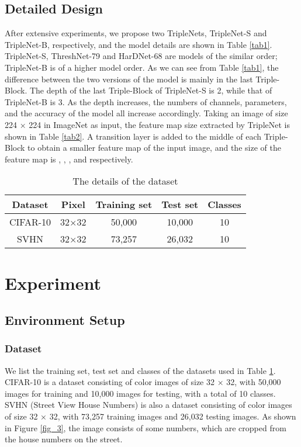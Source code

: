 \documentclass[default,iicol]{sn-jnl}
\theoremstyle{thmstyleone}\newtheorem{theorem}{Theorem}\newtheorem{proposition}[theorem]{Proposition}
\theoremstyle{thmstyletwo}\newtheorem{example}{Example}\newtheorem{remark}{Remark}
\theoremstyle{thmstylethree}\newtheorem{definition}{Definition}
\begin{document}
\subsection{Detailed Design}
After extensive experiments, we propose two TripleNets, TripleNet-S and TripleNet-B, respectively, and the model details are shown in Table \ref{tab1}. TripleNet-S, ThreshNet-79 and HarDNet-68 are models of the similar order; TripleNet-B is of a higher model order. As we can see from Table \ref{tab1}, the difference between the two versions of the model is mainly in the last Triple-Block. The depth of the last Triple-Block of TripleNet-S is 2, while that of TripleNet-B is 3. As the depth increases, the numbers of channels, parameters, and the accuracy of the model all increase accordingly. Taking an image of size 224 × 224 in ImageNet as input, the feature map size extracted by TripleNet is shown in Table \ref{tab2}. A transition layer is added to the middle of each Triple-Block to obtain a smaller feature map of the input image, and the size of the feature map is , , ,  and  respectively.

\begin{table}[]
\centering
\caption{The details of the dataset}
\label{tab3}
\begin{tabular}{|c|c|c|c|c|}
\hline
Dataset & Pixel & Training set & Test set & Classes \\ \hline
CIFAR-10 & 32×32 & 50,000 & 10,000 & 10 \\ \hline
SVHN & 32×32 & 73,257 & 26,032 & 10 \\ \hline
\end{tabular}
\end{table}

\section{Experiment}
\subsection{Environment Setup}
\subsubsection{Dataset}
We list the training set, test set and classes of the datasets used in Table \ref{tab3}. CIFAR-10 \cite{krizhevsky2009learning} is a dataset consisting of color images of size 32 × 32, with 50,000 images for training and 10,000 images for testing, with a total of 10 classes. SVHN (Street View House Numbers) \cite{netzer2011reading} is also a dataset consisting of color images of size 32 × 32, with 73,257 training images and 26,032 testing images. As shown in Figure \ref{fig_3}, the image consists of some numbers, which are cropped from the house numbers on the street.
\end{document}
